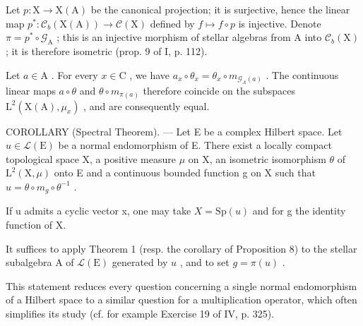 Let \(p \colon \mathrm{X} \to \mathrm{X}(\mathrm{A})\) be the canonical projection; it is surjective, hence the linear map \(p^* \colon \mathcal{C}_b(\mathrm{X}(\mathrm{A})) \to \mathcal{C}(\mathrm{X})\) defined by \(f \mapsto f \circ p\) is injective. Denote \(\pi = p^* \circ \mathcal{G}_{\mathrm{A}}\) ; this is an injective morphism of stellar algebras from A into \(\mathcal{C}_b(\mathrm{X})\) ; it is therefore isometric (prop. 9 of I, p. 112).

Let \(a \in \mathrm{A}\) . For every \(x \in \mathrm{C}\) , we have \(a_x \circ \theta_x = \theta_x \circ m_{\mathcal{G}_A(a)}\) . The continuous linear maps \(a \circ \theta\) and \(\theta \circ m_{\pi(a)}\) therefore coincide on the subspaces \(\mathrm{L}^2(\mathrm{X}(\mathrm{A}), \mu_x)\) , and are consequently equal.

COROLLARY (Spectral Theorem). --- Let E be a complex Hilbert space. Let \(u \in \mathcal{L}(\mathrm{E})\) be a normal endomorphism of E. There exist a locally compact topological space X, a positive measure \(\mu\) on X, an isometric isomorphism \(\theta\) of \(\mathrm{L}^{2}(\mathrm{X},\mu)\) onto E and a continuous bounded function g on X such that \(u = \theta \circ m_{g} \circ \theta^{-1}\) .

If u admits a cyclic vector x, one may take \(X = \mathrm{Sp}(u)\) and for g the identity function of X.

It suffices to apply Theorem 1 (resp. the corollary of Proposition 8) to the stellar subalgebra A of \(\mathcal{L}(\mathrm{E})\) generated by \(u\) , and to set \(g = \pi(u)\) .

This statement reduces every question concerning a single normal endomorphism of a Hilbert space to a similar question for a multiplication operator, which often simplifies its study (cf. for example Exercise 19 of IV, p. 325).


